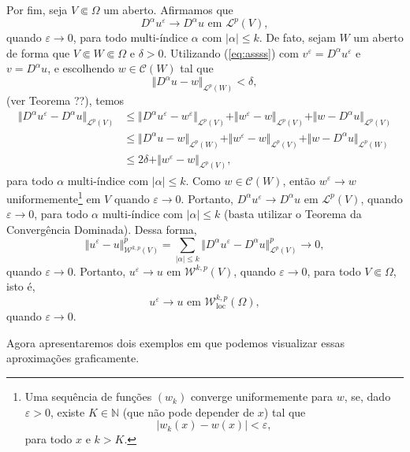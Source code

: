 \documentclass[a4paper, 11pt]{book}
\theoremstyle{definition}
\newcommand{\bN}{\mathbb{N}}
\newcommand{\cC}{\mathcal{C}}
\newcommand{\cL}{\mathcal{L}}
\newcommand{\cW}{\mathcal{W}}
\newcommand{\loc}{\mathrm{loc}}
\begin{document}
\begin{prf}
    Por fim, seja $V \Subset \Omega$ um aberto. Afirmamos que
    \begin{equation}
        D ^\alpha u^\varepsilon \to D^\alpha u \text{ em } \cL^p(V),
    \end{equation}
    quando $\varepsilon \to 0$, para todo multi-índice $\alpha$ com $|\alpha| \leqslant k$.
    De fato, sejam $W$ um aberto de forma que $V \Subset W \Subset \Omega$ e $\delta > 0$. Utilizando (\ref{eq:assss}) com $v ^\varepsilon = D^\alpha u^\varepsilon$ e $v = D^\alpha u$, e escolhendo $w \in \cC(W)$ tal que
    \[
        \Vert D^\alpha u - w \Vert_{\cL^p(W)} < \delta,
    \]
    (ver Teorema ??), temos
    \[
        \begin{aligned}
            \Vert D^\alpha u^\varepsilon - D^\alpha u \Vert_{\cL^p(V)} 
            &\leqslant \Vert D^\alpha u^\varepsilon - w^\varepsilon \Vert_{\cL^p(V)} + \Vert w^\varepsilon - w \Vert_{\cL^p(V)} + \Vert w - D^\alpha u \Vert_{\cL^p(V)}\\
            &\leqslant \Vert D^\alpha u - w \Vert_{\cL^p(W)} + \Vert w^\varepsilon - w \Vert_{\cL^p(V)} + \Vert w - D^\alpha u \Vert_{\cL^p(W)}\\ 
            &\leqslant 2\delta + \Vert w^\varepsilon - w \Vert_{\cL^p(V)},
        \end{aligned}
    \]
    para todo $\alpha$ multi-índice com $|\alpha| \leqslant k$.
    Como $w \in \cC(W)$, então $w^\varepsilon \to w$ uniformemente\footnote{Uma sequência de funções $(w_k)$ converge uniformemente para $w$, se, dado $\varepsilon > 0$, existe $K \in \bN$ (que não pode depender de $x$) tal que
    \[
        | w_k(x) - w(x) | < \varepsilon,
    \]
    para todo $x$ e $k > K$.
    } em $V$ quando $\varepsilon \to 0$. 
    Portanto, $D^\alpha u^\varepsilon \to D^\alpha u$ em $\cL^p(V)$, quando $\varepsilon \to 0$, para todo $\alpha$ multi-índice com $|\alpha| \leqslant k$ (basta utilizar o Teorema da Convergência Dominada).
    Dessa forma,
    \[
        \Vert u^\varepsilon - u \Vert^p_{\cW^{k,p}(V)} = \sum_{|\alpha| \leqslant k} \Vert D^\alpha u^\varepsilon - D^\alpha u \Vert^p_{\cL^p(V)} \to 0,
    \]
    quando $\varepsilon \to 0$. Portanto, $u^\varepsilon \to u$ em $\cW^{k,p}(V)$, quando $\varepsilon \to 0$, para todo $V \Subset \Omega$, isto é,
    \[
        u^\varepsilon \to u \text{ em } \cW^{k,p}_\loc(\Omega),
    \]
    quando $\varepsilon \to 0$.
\end{prf}

Agora apresentaremos dois exemplos em que podemos visualizar essas aproximações graficamente.
\end{document}
